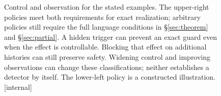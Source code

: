 \begin{figure}[t]
\caption{Control and observation for the stated examples. The upper-right
policies meet both requirements for exact realization; arbitrary policies
still require the full language conditions in \S\ref{sec:theorem} and
\S\ref{sec:partial}. A hidden trigger can prevent an exact guard even when
the effect is controllable. Blocking that effect on additional histories can
still preserve safety. Widening control and improving observations can change
these classifications; neither establishes a detector by itself. The lower-left
policy is a constructed illustration. [internal]}
\label{fig:quadrant}
\end{figure}
